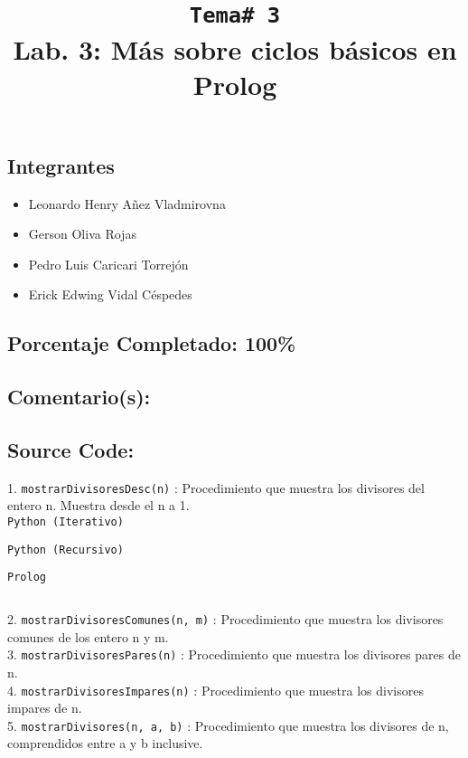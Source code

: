 \documentclass[10pt,letterpaper]{article}
\title{ \texttt{\normalsize Tema\# 3} \\ Lab. 3: Más sobre ciclos básicos en Prolog \vspace{-1cm} }
\begin{document}
\maketitle
\subsection*{Integrantes}
\begin{itemize}
\item Leonardo Henry Añez Vladmirovna
\item Gerson Oliva Rojas
\item Pedro Luis Caricari Torrejón
\item Erick Edwing Vidal Céspedes
\end{itemize}
\subsection*{Porcentaje Completado: 100\%}
\subsection*{Comentario(s):}
\subsection*{Source Code:}
1. \texttt{mostrarDivisoresDesc(n)} : Procedimiento que muestra los divisores del entero n. Muestra desde el n a 1. \\

\texttt{Python (Iterativo)}


\texttt{Python (Recursivo)}


\texttt{Prolog}

${}$\\
\pagebreak 

2. \texttt{mostrarDivisoresComunes(n, m)} : Procedimiento que muestra los divisores comunes de los entero n y m. \\

3. \texttt{mostrarDivisoresPares(n)} : Procedimiento que muestra los divisores pares de n. \\

4. \texttt{mostrarDivisoresImpares(n)} :  Procedimiento que muestra los divisores impares de n. \\

5. \texttt{mostrarDivisores(n, a, b)} :  Procedimiento que muestra los divisores de n, comprendidos entre a y b inclusive. \\
\end{document}

